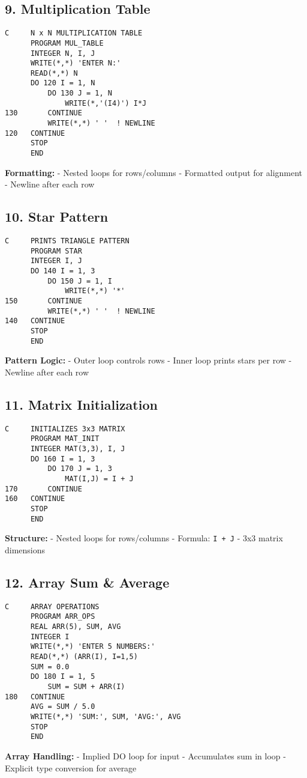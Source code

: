 \documentclass{book}
\begin{document}
\subsection*{9. Multiplication Table}
\begin{verbatim}
C     N x N MULTIPLICATION TABLE
      PROGRAM MUL_TABLE
      INTEGER N, I, J
      WRITE(*,*) 'ENTER N:'
      READ(*,*) N
      DO 120 I = 1, N
          DO 130 J = 1, N
              WRITE(*,'(I4)') I*J
130       CONTINUE
          WRITE(*,*) ' '  ! NEWLINE
120   CONTINUE
      STOP
      END
\end{verbatim}
\textbf{Formatting:}
- Nested loops for rows/columns
- Formatted output for alignment
- Newline after each row

\subsection*{10. Star Pattern}
\begin{verbatim}
C     PRINTS TRIANGLE PATTERN
      PROGRAM STAR
      INTEGER I, J
      DO 140 I = 1, 3
          DO 150 J = 1, I
              WRITE(*,*) '*'
150       CONTINUE
          WRITE(*,*) ' '  ! NEWLINE
140   CONTINUE
      STOP
      END
\end{verbatim}
\textbf{Pattern Logic:}
- Outer loop controls rows
- Inner loop prints stars per row
- Newline after each row

\subsection*{11. Matrix Initialization}
\begin{verbatim}
C     INITIALIZES 3x3 MATRIX
      PROGRAM MAT_INIT
      INTEGER MAT(3,3), I, J
      DO 160 I = 1, 3
          DO 170 J = 1, 3
              MAT(I,J) = I + J
170       CONTINUE
160   CONTINUE
      STOP
      END
\end{verbatim}
\textbf{Structure:}
- Nested loops for rows/columns
- Formula: \texttt{I + J}
- 3x3 matrix dimensions

\subsection*{12. Array Sum \& Average}
\begin{verbatim}
C     ARRAY OPERATIONS
      PROGRAM ARR_OPS
      REAL ARR(5), SUM, AVG
      INTEGER I
      WRITE(*,*) 'ENTER 5 NUMBERS:'
      READ(*,*) (ARR(I), I=1,5)
      SUM = 0.0
      DO 180 I = 1, 5
          SUM = SUM + ARR(I)
180   CONTINUE
      AVG = SUM / 5.0
      WRITE(*,*) 'SUM:', SUM, 'AVG:', AVG
      STOP
      END
\end{verbatim}
\textbf{Array Handling:}
- Implied DO loop for input
- Accumulates sum in loop
- Explicit type conversion for average
\end{document}
